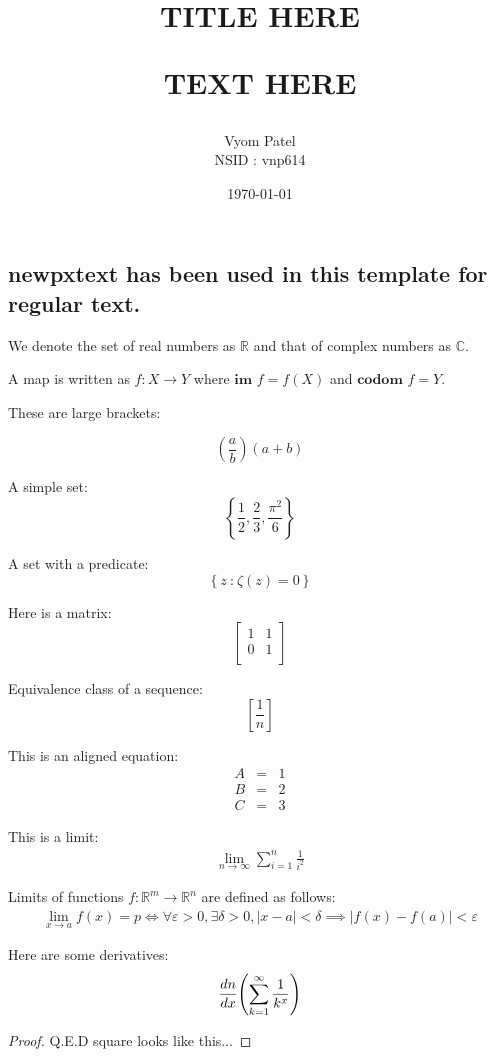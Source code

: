 \documentclass[fleqn]{article}
\title{\textbf{\huge{TITLE HERE}}
	
    \huge{TEXT HERE}
}
\author{Vyom Patel \\ NSID : vnp614}
\date{\today}
\newcommand{\R}{\mathbb{R}}
\newcommand{\C}{\mathbb{C}}
\newcommand{\fn}[3]{#1 : #2 \rightarrow #3}
\newcommand{\br}[1]{\left( #1 \right)}
\newcommand{\curly}[1]{\left\{ #1 \right\}}
\newcommand{\set}[2]{\curly{#1\ \textbf{:}\ #2}}
\newcommand{\im}{\textbf{im }}
\newcommand{\codom}{\textbf{codom }}
\newcommand{\sbr}[1]{\left[ #1 \right]}
\newcommand{\eqn}[1]{\begin{eqnarray*} #1 \end{eqnarray*}}
\newcommand{\abs}[1]{\left| #1 \right|}
\newcommand{\eps}{\varepsilon}%
\newcommand{\del}{\delta}
\newcommand{\limit}[3]{\lim_{#1 \rightarrow #2}#3}
\newcommand{\bmat}[1]{\ensuremath{\begin{bmatrix} #1 \end{bmatrix}}}
\newcommand{\diff}[3][]{%
	\ifthenelse{\equal{#1}{}}{%
		\ensuremath{\frac{d{#2}}{d{#3}}}%
	}{%
		\ensuremath{\frac{d^{#1}\!{#2}}{d{#3}^{#1}}}%
	}%
}
\begin{document}
\maketitle

\subsection{newpxtext has been used in this template for regular text.}

We denote the set of real numbers as $\R$ and that of complex numbers as
$\C$.

A map is written as $\fn{f}{X}{Y}$ where $\im f = f(X)$ and $\codom f = Y$.

These are large brackets:

\[
\br{\frac{a}{b}}\br{a + b}
\]

A simple set:
\[
  \curly{\frac{1}{2}, \frac{2}{3}, \frac{\pi^2}{6}}
\]

A set with a predicate:
\[
  \set{z}{\zeta\br{z} = 0}
\]

Here is a matrix:
\[
  \bmat{
    1 & 1 \\
    0 & 1 \\
  }
\]

Equivalence class of a sequence:
\[
  \sbr{\frac{1}{n}}
\]

This is an aligned equation:
\eqn{
  A &=& 1\\
  B &=& 2\\
  C &=& 3
}

This is a limit:
\eqn{
  \limit{n}{\infty}{\sum_{i = 1}^n \frac{1}{i^2}}
}

Limits of functions $\fn{f}{\R^m}{\R^n}$ are defined as follows:
\eqn{
  \limit{x}{a}{f(x)} = p \iff
    \forall \eps > 0, \exists \del > 0, \abs{x - a} < \del
    \implies \abs{f(x) - f(a)} < \eps
}

Here are some derivatives:
\eqn{
  \diff{n}{x}{\br{\sum_{k = 1}^{\infty}\frac{1}{k^x}}}
}

\begin{proof}
    Q.E.D square looks like this...
\end{proof}
\end{document}
